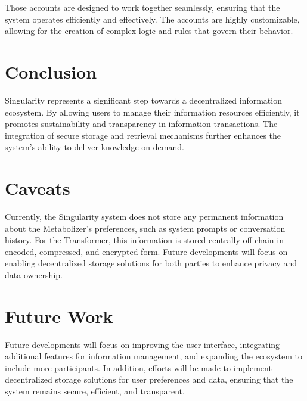 \documentclass{article}
\begin{document}
Those accounts are designed to work together seamlessly, ensuring that the system operates efficiently and effectively. The accounts are highly customizable, allowing for the creation of complex logic and rules that govern their behavior.

\section{Conclusion}
Singularity represents a significant step towards a decentralized information ecosystem. By allowing users to manage their information resources efficiently, it promotes sustainability and transparency in information transactions. The integration of secure storage and retrieval mechanisms further enhances the system's ability to deliver knowledge on demand.

\section{Caveats}
Currently, the Singularity system does not store any permanent information about the Metabolizer's preferences, such as system prompts or conversation history. For the Transformer, this information is stored centrally off-chain in encoded, compressed, and encrypted form. Future developments will focus on enabling decentralized storage solutions for both parties to enhance privacy and data ownership.

\section{Future Work}
Future developments will focus on improving the user interface, integrating additional features for information management, and expanding the ecosystem to include more participants. In addition, efforts will be made to implement decentralized storage solutions for user preferences and data, ensuring that the system remains secure, efficient, and transparent.

\newpage
\makeworkscited
\end{document}
